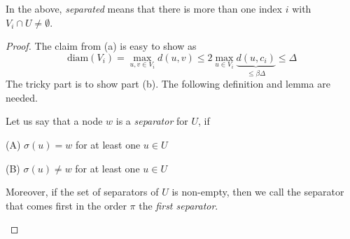 In the above, \emph{separated} means that there is more than one index $i$ with $V_i \cap U \neq \emptyset$.
\begin{proof}
The claim from (a) is easy to show as
\[
\textrm{diam}(V_i) = \max_{u,v \in V_i} d(u,v) \leq 2\max_{u \in V_i} \underbrace{d(u,c_i)}_{\leq \beta \Delta} \leq \Delta
\]
The tricky part is to show part (b).
The following definition and lemma are needed.
\begin{definition}
  Let us say that a node $w$ is a \emph{separator} for $U$, if
  \begin{enumerate*}
  \item[(A)] $\sigma(u) = w$ for at least one $u \in U$
  \item[(B)] $\sigma(u) \neq w$ for at least one $u \in U$
  \end{enumerate*}
  Moreover, if the set of separators of $U$ is non-empty, then we call the separator
  that comes first in the order $\pi$ the \emph{first separator}.
\end{definition}



\end{proof}
